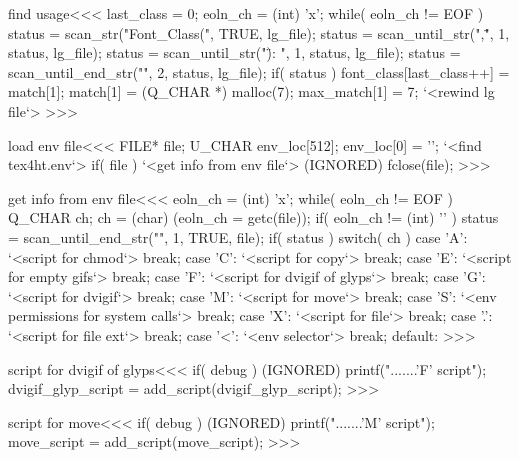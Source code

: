 \<find usage\><<<
last_class = 0;
eoln_ch = (int) 'x';   
while( eoln_ch != EOF ) {              
   status = scan_str("Font_Class(", TRUE, lg_file);
   status = scan_until_str(",\"", 1, status, lg_file);
   status = scan_until_str("\"): ", 1, status, lg_file);
   status = scan_until_end_str("", 2, status, lg_file);
   if( status ){
      font_class[last_class++] = match[1];  
      match[1] = (Q_CHAR *) malloc(7);  max_match[1] = 7;
}  }
`<rewind lg file`>
>>>




\<load env file\><<<
{                                FILE* file;
                                 U_CHAR  env_loc[512];
   env_loc[0] = '\0';
   `<find tex4ht.env`>
   if( file ){  
      `<get info from env file`>
      (IGNORED) fclose(file);
}  }
>>>





\<get info from env file\><<<
eoln_ch = (int) 'x';
while( eoln_ch != EOF ) {                Q_CHAR ch;
  ch = (char) (eoln_ch = getc(file));          
  if( eoln_ch != (int) '\n' ){
     status = scan_until_end_str("", 1, TRUE, file);
     if( status ){
       switch( ch ){
         case 'A':{ `<script for chmod`>  break;}
         case 'C':{ `<script for copy`>  break;}
         case 'E':{ `<script for empty gifs`>  break;}
         case 'F':{ `<script for dvigif of glyps`>   break;}
         case 'G':{ `<script for dvigif`>   break;}
         case 'M':{ `<script for move`>  break;}
         case 'S':{ `<env permissions for system calls`>  break;}
         case 'X':{ `<script for file`>  break;}
         case '.':{ `<script for file ext`>  break;}
         case '<':{ `<env selector`>  break;}
         default:{ }
} }  }  }
>>>





\<script for dvigif of glyps\><<<
if( debug ){  
      (IGNORED) printf(".......'F' script\n"); }
dvigif_glyp_script = add_script(dvigif_glyp_script);
>>>


\<script for move\><<<
if( debug ){  
      (IGNORED) printf(".......'M' script\n"); }
move_script = add_script(move_script);
>>>


